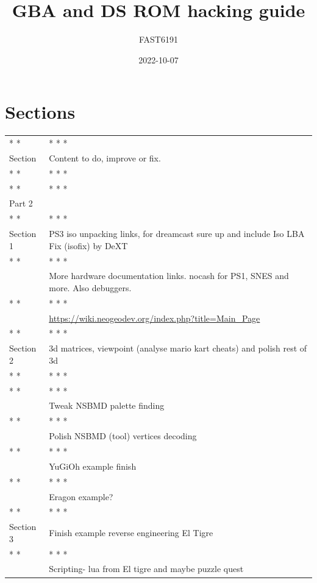 \documentclass[
]{book}
\title{GBA and DS ROM hacking guide}
\author{FAST6191}
\date{2022-10-07}
\begin{document}
\maketitle

{
\setcounter{tocdepth}{1}
\tableofcontents
}
\hypertarget{sections}{%
\chapter{Sections}\label{sections}}

\begin{longtable}[]{@{}
  >{\raggedright\arraybackslash}p{}
  >{\raggedright\arraybackslash}p{}@{}}
\toprule()
\endhead
* * * & * * * \\
Section & Content to do, improve or fix. \\
* * * & * * * \\
* * * & * * * \\
Part 2 & \\
* * * & * * * \\
Section 1 & PS3 iso unpacking links, for dreamcast sure up and include Iso LBA Fix (isofix) by DeXT \\
* * * & * * * \\
& More hardware documentation links. nocash for PS1, SNES and more. Also debuggers. \\
* * * & * * * \\
& \url{https://wiki.neogeodev.org/index.php?title=Main_Page} \\
* * * & * * * \\
Section 2 & 3d matrices, viewpoint (analyse mario kart cheats) and polish rest of 3d \\
* * * & * * * \\
* * * & * * * \\
& Tweak NSBMD palette finding \\
* * * & * * * \\
& Polish NSBMD (tool) vertices decoding \\
* * * & * * * \\
& YuGiOh example finish \\
* * * & * * * \\
& Eragon example? \\
* * * & * * * \\
Section 3 & Finish example reverse engineering El Tigre \\
* * * & * * * \\
& Scripting- lua from El tigre and maybe puzzle quest \\

\end{longtable}
\end{document}
